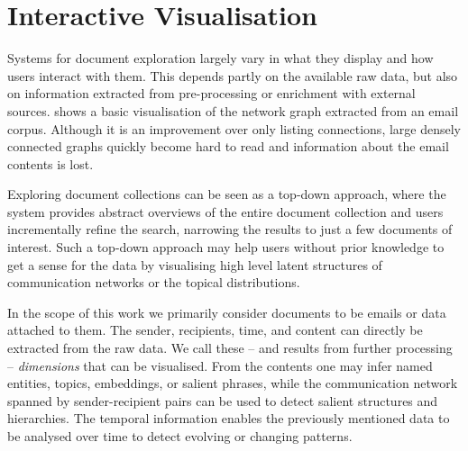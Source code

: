 

\section{Interactive Visualisation}
Systems for document exploration largely vary in what they display and how users interact with them.
This depends partly on the available raw data, but also on information extracted from pre-processing or enrichment with external sources.
 shows a basic visualisation of the network graph extracted from an email corpus.
Although it is an improvement over only listing connections, large densely connected graphs quickly become hard to read and information about the email contents is lost.

Exploring document collections can be seen as a top-down approach, where the system provides abstract overviews of the entire document collection and users incrementally refine the search, narrowing the results to just a few documents of interest.
Such a top-down approach may help users without prior knowledge to get a sense for the data by visualising high level latent structures of communication networks or the topical distributions.

In the scope of this work we primarily consider documents to be emails or data attached to them.
The sender, recipients, time, and content can directly be extracted from the raw data.
We call these -- and results from further processing -- \textit{dimensions} that can be visualised.
From the contents one may infer named entities, topics, embeddings, or salient phrases, while the communication network spanned by sender-recipient pairs can be used to detect salient structures and hierarchies.
The temporal information enables the previously mentioned data to be analysed over time to detect evolving or changing patterns.

